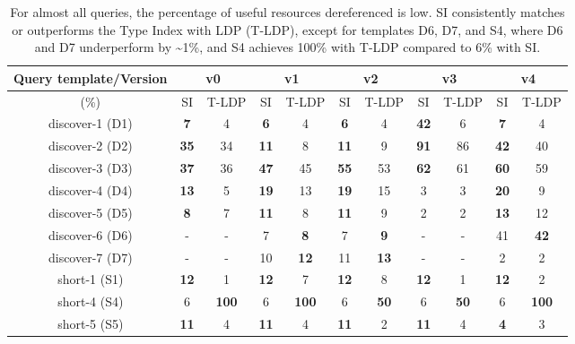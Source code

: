 \begin{table}[htbp]
	\begin{center}
		\begin{tabular}{|c|c|c|c|c|c|c|c|c|c|c|}
			\hline
            \multicolumn{1}{|c}{Query template/Version} & \multicolumn{2}{|c|}{v0} & \multicolumn{2}{|c|}{v1} & \multicolumn{2}{|c|}{v2} & \multicolumn{2}{|c|}{v3} & \multicolumn{2}{|c|}{v4} \\
			\hline
            (\%) & SI  & T-LDP & SI & T-LDP & SI & T-LDP& SI & T-LDP & SI & T-LDP \\
            \hline
			discover-1 (D1) & \textbf{7} & 4 & \textbf{6} & 4 & \textbf{6} & 4 & \textbf{42} & 6 & \textbf{7} & 4 \\
            \hline
            discover-2 (D2) & \textbf{35} & 34 & \textbf{11} & 8 & \textbf{11} & 9 & \textbf{91} & 86 & \textbf{42} & 40 \\
			\hline
            discover-3 (D3) & \textbf{37} & 36 & \textbf{47} & 45 & \textbf{55} & 53 & \textbf{62} & 61 & \textbf{60} & 59 \\
			\hline
            discover-4 (D4) & \textbf{13} & 5 & \textbf{19} & 13 & \textbf{19} & 15 & 3 & 3 & \textbf{20} & 9 \\
			\hline
            discover-5 (D5) & \textbf{8} & 7 & \textbf{11} & 8 & \textbf{11} & 9 & 2 & 2 & \textbf{13} & 12 \\
			\hline
            discover-6 (D6) & - & - & 7 & \textbf{8} & 7 & \textbf{9} & - & - & 41 & \textbf{42} \\
			\hline
            discover-7 (D7) & - & - & 10 & \textbf{12} & 11 & \textbf{13} & - & - & 2 & 2 \\
			\hline
            short-1 (S1) & \textbf{12} & 1 & \textbf{12} & 7 & \textbf{12} & 8 & \textbf{12} & 1 & \textbf{12} & 2 \\
			\hline
            short-4 (S4) & 6 & \textbf{100} & 6 & \textbf{100} & 6 & \textbf{50} & 6 & \textbf{50} & 6 & \textbf{100} \\
			\hline
            short-5 (S5) & \textbf{11} & 4 & \textbf{11} & 4 & \textbf{11} & 2 & \textbf{11} & 4 & \textbf{4} & 3 \\
			\hline
		\end{tabular}
	\end{center}
	\caption{
        For almost all queries, the percentage of useful resources dereferenced is low. 
		SI consistently matches or outperforms the Type Index with LDP (T-LDP), except for templates D6, D7, and S4, where D6 and D7 underperform by \textasciitilde 1\%, and S4 achieves 100\% with T-LDP compared to 6\% with SI.
		}
	\label{tab:ratioUsefulResources}
\end{table}
